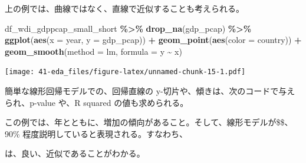 \documentclass[
  xelatex, ja=standard]{bxjsbook}
\newenvironment{Shaded}{\begin{snugshade}}{\end{snugshade}}
\newcommand{\AttributeTok}[1]{\textcolor[rgb]{0.13,0.29,0.53}{#1}}
\newcommand{\FunctionTok}[1]{\textcolor[rgb]{0.13,0.29,0.53}{\textbf{#1}}}
\newcommand{\NormalTok}[1]{#1}
\newcommand{\SpecialCharTok}[1]{\textcolor[rgb]{0.81,0.36,0.00}{\textbf{#1}}}
\newcommand{\StringTok}[1]{\textcolor[rgb]{0.31,0.60,0.02}{#1}}
\theoremstyle{definition}
\theoremstyle{definition}
\theoremstyle{definition}
\theoremstyle{definition}
\theoremstyle{remark}
\begin{document}
上の例では、曲線ではなく、直線で近似することも考えられる。

\begin{Shaded}
\begin{Highlighting}[]
\NormalTok{df\_wdi\_gdppcap\_small\_short }\SpecialCharTok{\%\textgreater{}\%} \FunctionTok{drop\_na}\NormalTok{(gdp\_pcap) }\SpecialCharTok{\%\textgreater{}\%}
  \FunctionTok{ggplot}\NormalTok{(}\FunctionTok{aes}\NormalTok{(}\AttributeTok{x =}\NormalTok{ year, }\AttributeTok{y =}\NormalTok{ gdp\_pcap)) }\SpecialCharTok{+} 
  \FunctionTok{geom\_point}\NormalTok{(}\FunctionTok{aes}\NormalTok{(}\AttributeTok{color =}\NormalTok{ country)) }\SpecialCharTok{+} 
  \FunctionTok{geom\_smooth}\NormalTok{(}\AttributeTok{method =} \StringTok{\textquotesingle{}lm\textquotesingle{}}\NormalTok{, }\AttributeTok{formula =} \StringTok{\textquotesingle{}y \textasciitilde{} x\textquotesingle{}}\NormalTok{)}
\end{Highlighting}
\end{Shaded}

\texttt{[image: 41-eda\_files/figure-latex/unnamed-chunk-15-1.pdf]}

簡単な線形回帰モデルでの、回帰直線の y-切片や、傾きは、次のコードで与えられ、p-value や、R squared の値も求められる。

この例では、年とともに、増加の傾向があること。そして、線形モデルが\$\$、90\% 程度説明していると表現される。すなわち、

は、良い、近似であることがわかる。
\end{document}
